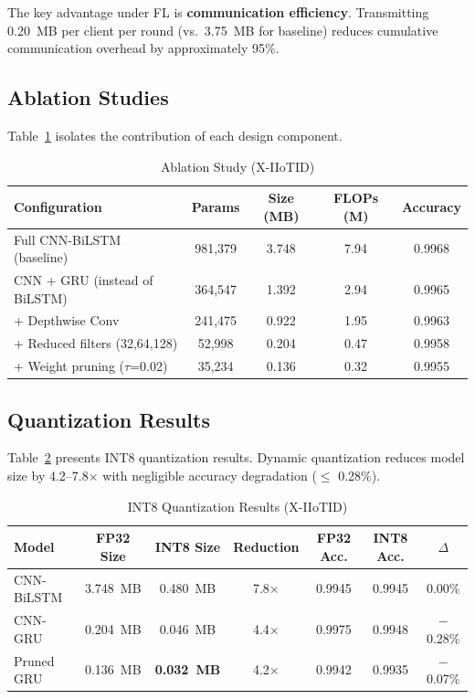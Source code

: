 \documentclass[a4paper,fleqn]{cas-sc}
\begin{document}
The key advantage under FL is \textbf{communication efficiency}. Transmitting 0.20~MB per client per round (vs.\ 3.75~MB for baseline) reduces cumulative communication overhead by approximately 95\%.

\subsection{Ablation Studies}
\label{sec:ablation}

Table~\ref{tab:ablation} isolates the contribution of each design component.

\begin{table}[t]
\centering
\caption{Ablation Study (X-IIoTID)}
\label{tab:ablation}
\begin{tabular}{lcccc}
\toprule
Configuration & Params & Size (MB) & FLOPs (M) & Accuracy \\
\midrule
Full CNN-BiLSTM (baseline) & 981,379 & 3.748 & 7.94 & 0.9968 \\
CNN + GRU (instead of BiLSTM) & 364,547 & 1.392 & 2.94 & 0.9965 \\
+ Depthwise Conv & 241,475 & 0.922 & 1.95 & 0.9963 \\
+ Reduced filters (32,64,128) & 52,998 & 0.204 & 0.47 & 0.9958 \\
+ Weight pruning ($\tau$=0.02) & 35,234 & 0.136 & 0.32 & 0.9955 \\
\bottomrule
\end{tabular}
\end{table}

\subsection{Quantization Results}
\label{sec:quant_results}

Table~\ref{tab:quant} presents INT8 quantization results. Dynamic quantization reduces model size by 4.2--7.8$\times$ with negligible accuracy degradation ($\le$ 0.28\%).

\begin{table}[t]
\centering
\caption{INT8 Quantization Results (X-IIoTID)}
\label{tab:quant}
\begin{tabular}{lcccccc}
\toprule
Model & FP32 Size & INT8 Size & Reduction & FP32 Acc. & INT8 Acc. & $\Delta$ \\
\midrule
CNN-BiLSTM & 3.748~MB & 0.480~MB & 7.8$\times$ & 0.9945 & 0.9945 & 0.00\% \\
CNN-GRU & 0.204~MB & 0.046~MB & 4.4$\times$ & 0.9975 & 0.9948 & $-$0.28\% \\
Pruned GRU & 0.136~MB & \textbf{0.032~MB} & 4.2$\times$ & 0.9942 & 0.9935 & $-$0.07\% \\
\bottomrule
\end{tabular}
\end{table}
\end{document}
